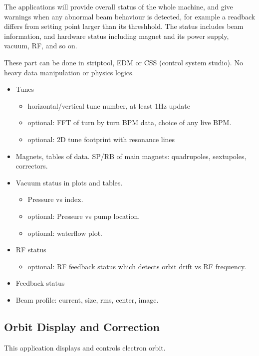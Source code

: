 \documentclass[11pt,oneside,letterpaper,showtrims,article]{memoir}
\newcommand{\TODO}{\textcolor{red}{\bfseries TODO!}\xspace}
\begin{document}
The applications will provide overall status of the whole machine, and
give warnings when any abnormal beam behaviour is detected, for example
a readback differs from setting point larger than its threshhold. The
status includes beam information, and hardware status including magnet
and its power supply, vacuum, RF, and so on.

These part can be done in striptool, EDM or CSS (control system
studio). No heavy data manipulation or physics logics. 


\begin{itemize}
\item Tunes
  \begin{itemize}
  \item horizontal/vertical tune number, at least 1Hz update
  \item optional: FFT of turn by turn BPM data, choice of any live BPM.
  \item optional: 2D tune footprint with resonance lines
  \end{itemize}
\item Magnets, tables of data. SP/RB of main magnets: quadrupoles, sextupoles, correctors.
\item Vacuum status in plots and tables.
  \begin{itemize}
  \item Pressure vs index.
  \item optional: Pressure vs pump location.
  \item optional: waterflow plot.
  \end{itemize}
\item RF status
  \begin{itemize}%
  \item optional: RF feedback status which detects orbit drift vs RF frequency.
  \end{itemize}
\item Feedback status
\item Beam profile: current, size, rms, center, image.
\end{itemize}


\subsection{Orbit Display and Correction}

This application displays and controls electron orbit.
  
\end{document}
